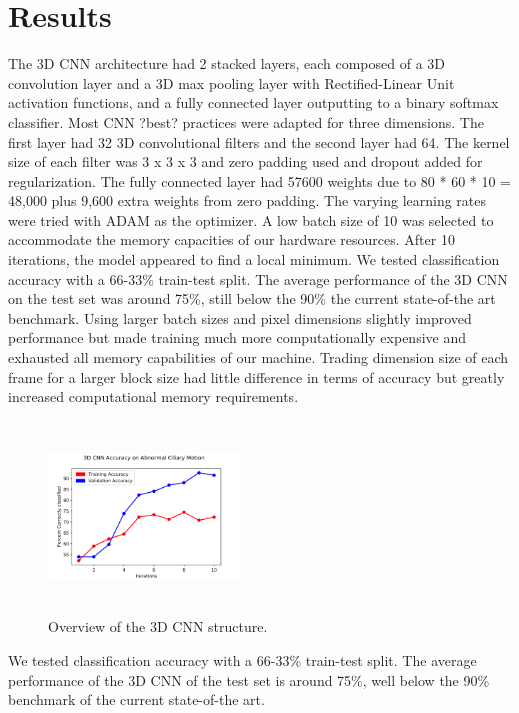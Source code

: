 \section{Results}

The 3D CNN architecture had 2 stacked layers, each composed of a 3D convolution layer and a 3D max pooling layer with Rectified-Linear Unit \cite{nair2010rectified} activation functions, and a fully connected layer outputting to a binary softmax classifier. Most CNN ?best? practices \cite{goodfellow_bengio_courville_2016} were adapted for three dimensions. The first layer had 32 3D convolutional filters and the second layer had 64. The kernel size of each filter was 3 x 3 x 3 and zero padding used and dropout \cite{srivastava2014dropout} added for regularization. The fully connected layer had 57600 weights due to 80 * 60 * 10 = 48,000 plus 9,600 extra weights from zero padding. The varying learning rates were tried with ADAM\cite{kingma2014adam} as the optimizer. A low batch size of 10 was selected to accommodate the memory capacities of our hardware resources. After 10 iterations, the model appeared to find a local minimum. We tested classification accuracy with a 66-33\% train-test split. 
The average performance of the 3D CNN on the test set was around 75\%, still below the 90\% the current state-of-the art benchmark. Using larger batch sizes and pixel dimensions slightly improved performance but made training much more computationally expensive and exhausted all memory capabilities of our machine. Trading dimension size of each frame for a larger block size had little difference in terms of accuracy but greatly increased computational memory requirements.  

\begin{figure}[H]
\includegraphics[height=2in, width=2in]{CNN_graph}
\caption{Overview of the 3D CNN structure.}
\setlength{\belowcaptionskip}{-10pt}

\end{figure}
We tested classification accuracy with a 66-33\% train-test split. 
The average performance of the 3D CNN of the test set is around 75\%, well below the 90\% benchmark of the current state-of-the art. 

